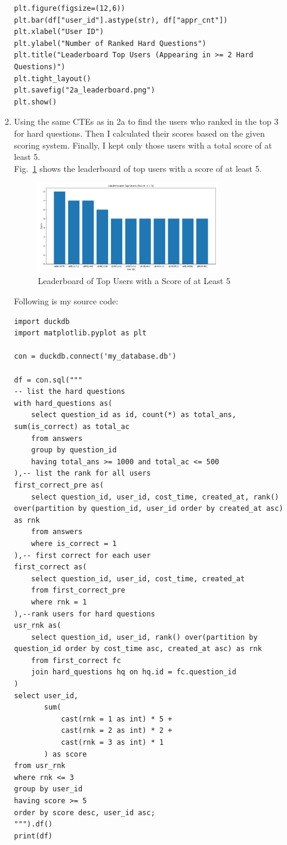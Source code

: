 \documentclass[12pt,a4paper]{article}
\begin{document}
\begin{enumerate}
\begin{enumerate}
\begin{verbatim}
plt.figure(figsize=(12,6))
plt.bar(df["user_id"].astype(str), df["appr_cnt"])
plt.xlabel("User ID")
plt.ylabel("Number of Ranked Hard Questions")
plt.title("Leaderboard Top Users (Appearing in >= 2 Hard Questions)")
plt.tight_layout()
plt.savefig("2a_leaderboard.png")
plt.show()            
        \end{verbatim}
        \item Using the same CTEs as in 2a to find the users who ranked in the top 3 for hard questions. Then I calculated their scores based on the given scoring system. Finally, I kept only those users with a total score of at least 5.\\
        Fig.~\ref{fig:2b} shows the leaderboard of top users with a score of at least 5.
        \begin{figure}[H]
            \centering
            \includegraphics[width=0.8\textwidth]{code/2b_leaderboard.png}
            \caption{Leaderboard of Top Users with a Score of at Least 5}
            \label{fig:2b}
        \end{figure}
        Following is my source code:
        \begin{verbatim}
import duckdb
import matplotlib.pyplot as plt

con = duckdb.connect('my_database.db')

df = con.sql("""
-- list the hard questions
with hard_questions as(
    select question_id as id, count(*) as total_ans, sum(is_correct) as total_ac
    from answers
    group by question_id
    having total_ans >= 1000 and total_ac <= 500
),-- list the rank for all users
first_correct_pre as(
    select question_id, user_id, cost_time, created_at, rank() over(partition by question_id, user_id order by created_at asc) as rnk
    from answers
    where is_correct = 1
),-- first correct for each user
first_correct as(
    select question_id, user_id, cost_time, created_at
    from first_correct_pre
    where rnk = 1
),--rank users for hard questions
usr_rnk as(
    select question_id, user_id, rank() over(partition by question_id order by cost_time asc, created_at asc) as rnk
    from first_correct fc
    join hard_questions hq on hq.id = fc.question_id
)
select user_id, 
       sum(
           cast(rnk = 1 as int) * 5 +
           cast(rnk = 2 as int) * 2 +
           cast(rnk = 3 as int) * 1
       ) as score
from usr_rnk
where rnk <= 3
group by user_id
having score >= 5
order by score desc, user_id asc;
""").df()
print(df)


\end{verbatim}
\end{enumerate}
\end{enumerate}
\end{document}
